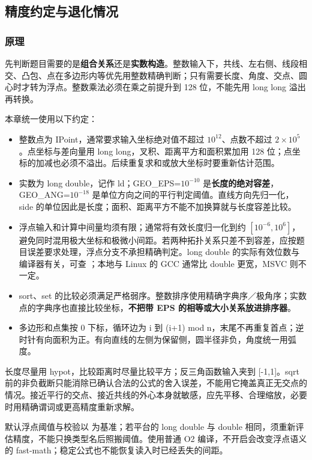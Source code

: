 \subsection{精度约定与退化情况}
\label{geo:precision}
\subsubsection*{原理}

先判断题目需要的是\textbf{组合关系}还是\textbf{实数构造}。整数输入下，共线、左右侧、线段相交、凸包、点在多边形内等优先用整数精确判断；只有需要长度、角度、交点、圆心时才转为浮点。整数乘法必须在乘之前提升到 128 位，不能先用 long long 溢出再转换。

本章统一使用以下约定：
\begin{itemize}
 \item 整数点为 IPoint，通常要求输入坐标绝对值不超过 $10^{12}$、点数不超过 $2\times10^5$。点坐标与差向量用 long long，叉积、距离平方和面积累加用 128 位；点坐标的加减也必须不溢出。后续重复求和或放大坐标时要重新估计范围。
 \item 实数为 long double，记作 ld；GEO\_EPS=$10^{-10}$ 是\textbf{长度的绝对容差}，GEO\_ANG=$10^{-18}$ 是单位方向之间的平行判定阈值。直线方向先归一化，side 的单位因此是长度；面积、距离平方不能不加换算就与长度容差比较。
 \item 浮点输入和计算中间量均须有限；通常将有效长度归一化到约 $[10^{-6},10^6]$，避免同时混用极大坐标和极微小间距。若两种拓扑关系只差不到容差，应按题目误差要求处理，浮点分支不承担精确判定。long double 的实际有效位数与编译器有关，可查 ；本地与 Linux 的 GCC 通常比 double 更宽，MSVC 则不一定。
 \item sort、set 的比较必须满足严格弱序。整数排序使用精确字典序／极角序；实数点的字典序也直接比较坐标，\textbf{不把带 EPS 的相等或大小关系放进排序器}。
 \item 多边形和点集按 0 下标，循环边为 i 到 (i+1) mod n，末尾不再重复首点；逆时针有向面积为正。有向直线的左侧为保留侧，圆半径非负，角度统一用弧度。
\end{itemize}
长度尽量用 hypot，比较距离时尽量比较平方；反三角函数输入夹到 [-1,1]。sqrt 前的非负截断只能消除已确认合法的公式的舍入误差，不能用它掩盖真正无交点的情况。接近平行的交点、接近共线的外心本身就敏感，应先平移、合理缩放，必要时用精确谓词或更高精度重新求解。

默认浮点阈值与校验以  为基准；若平台的 long double 与 double 相同，须重新评估精度，不能只换类型名后照搬阈值。使用普通 O2 编译，不开启会改变浮点语义的 fast-math；稳定公式也不能恢复读入时已经丢失的间距。

